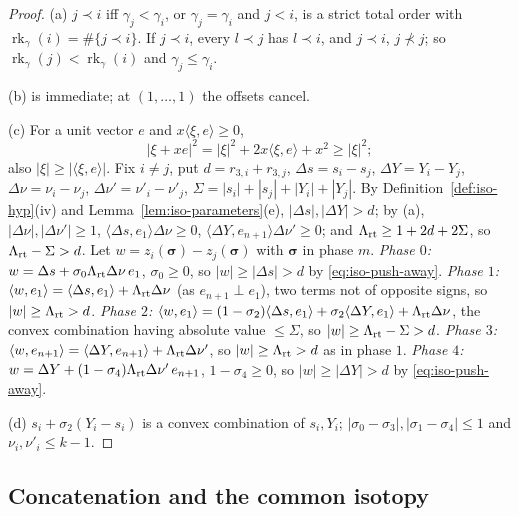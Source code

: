 \begin{proof}
(a) $j\prec i$ iff $\gamma_j<\gamma_i$, or $\gamma_j=\gamma_i$ and $j<i$, is a strict total order with $\operatorname{rk}_\gamma(i)=\#\{j\prec i\}$. If $j\prec i$, every $l\prec j$ has $l\prec i$, and $j\prec i$, $j\not\prec j$; so $\operatorname{rk}_\gamma(j)<\operatorname{rk}_\gamma(i)$ and $\gamma_j\le\gamma_i$.

(b) is immediate; at $(1,\dots,1)$ the offsets cancel.

(c) For a unit vector $e$ and $x\langle\xi,e\rangle\ge0$,
\begin{equation}\label{eq:iso-push-away}
 |\xi+xe|^2=|\xi|^2+2x\langle\xi,e\rangle+x^2\ge|\xi|^2 ;
\end{equation}
also $|\xi|\ge|\langle\xi,e\rangle|$. Fix $i\ne j$, put $d=r_{3,i}+r_{3,j}$, $\Delta s=s_i-s_j$, $\Delta Y=Y_i-Y_j$, $\Delta\nu=\nu_i-\nu_j$, $\Delta\nu'=\nu'_i-\nu'_j$, $\Sigma=|s_i|+|s_j|+|Y_i|+|Y_j|$. By Definition~\ref{def:iso-hyp}(iv) and Lemma~\ref{lem:iso-parameters}(e), $|\Delta s|,|\Delta Y|>d$; by (a), $|\Delta\nu|,|\Delta\nu'|\ge1$, $\langle\Delta s,e_1\rangle\Delta\nu\ge0$, $\langle\Delta Y,e_{n+1}\rangle\Delta\nu'\ge0$; and $\Lambda_{\rm rt}\ge1+2d+2\Sigma$, so $\Lambda_{\rm rt}-\Sigma>d$. Let $w=z_i(\boldsymbol\sigma)-z_j(\boldsymbol\sigma)$ with $\boldsymbol\sigma$ in phase $m$.
\emph{Phase $0$:} $w=\Delta s+\sigma_0\Lambda_{\rm rt}\Delta\nu\,e_1$, $\sigma_0\ge0$, so $|w|\ge|\Delta s|>d$ by \eqref{eq:iso-push-away}.
\emph{Phase $1$:} $\langle w,e_1\rangle=\langle\Delta s,e_1\rangle+\Lambda_{\rm rt}\Delta\nu$ (as $e_{n+1}\perp e_1$), two terms not of opposite signs, so $|w|\ge\Lambda_{\rm rt}>d$.
\emph{Phase $2$:} $\langle w,e_1\rangle=(1-\sigma_2)\langle\Delta s,e_1\rangle+\sigma_2\langle\Delta Y,e_1\rangle+\Lambda_{\rm rt}\Delta\nu$, the convex combination having absolute value $\le\Sigma$, so $|w|\ge\Lambda_{\rm rt}-\Sigma>d$.
\emph{Phase $3$:} $\langle w,e_{n+1}\rangle=\langle\Delta Y,e_{n+1}\rangle+\Lambda_{\rm rt}\Delta\nu'$, so $|w|\ge\Lambda_{\rm rt}>d$ as in phase $1$.
\emph{Phase $4$:} $w=\Delta Y+(1-\sigma_4)\Lambda_{\rm rt}\Delta\nu'\,e_{n+1}$, $1-\sigma_4\ge0$, so $|w|\ge|\Delta Y|>d$ by \eqref{eq:iso-push-away}.

(d) $s_i+\sigma_2(Y_i-s_i)$ is a convex combination of $s_i,Y_i$; $|\sigma_0-\sigma_3|,|\sigma_1-\sigma_4|\le1$ and $\nu_i,\nu'_i\le k-1$.
\end{proof}

\subsection{Concatenation and the common isotopy}\label{sec:iso-concat}

